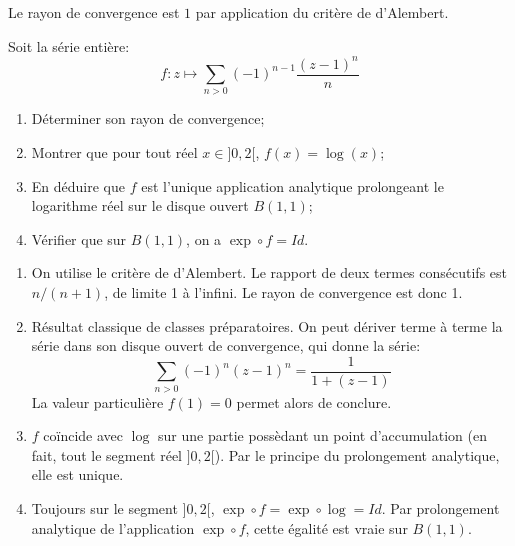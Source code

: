 \documentclass[a4paper, 12pt]{amsart}
\begin{document}
Le rayon de convergence est $1$ par application du critère de d'Alembert.
\begin{fex}
 Soit la série entière:
\[
f \colon z \mapsto \sum_{n >0}(-1)^{n-1}\frac{(z-1)^n}{n}
\]
\begin{enumerate}
  \item Déterminer son rayon de convergence;
  \item Montrer que pour tout réel $x \in ]0,2[$, $f(x)=\log(x)$;
  \item En déduire que $f$ est l'unique application analytique prolongeant le
  logarithme réel sur le disque ouvert $B(1,1)$;
  \item Vérifier que sur $B(1,1)$, on a $\exp \circ f = Id$.
\end{enumerate}
\end{fex}
\begin{enumerate}
 \item On utilise le critère de d'Alembert. Le rapport de deux termes
consécutifs est $n/(n+1)$, de limite 1 à l'infini. Le rayon de convergence est
donc 1.
\item Résultat classique de classes préparatoires. On peut dériver terme à
terme la série dans son disque ouvert de convergence, qui donne la série:
\[
\sum_{n >0}(-1)^{n} (z-1)^n = \frac{1}{1+(z-1)}
\]
La valeur particulière $f(1)=0$ permet alors de conclure.
\item $f$ coïncide avec $\log$ sur une partie possèdant un point d'accumulation
(en fait, tout le segment réel $]0,2[$). Par le principe du prolongement
analytique, elle est unique.
\item Toujours sur le segment $]0,2[$, $\exp \circ f = \exp \circ \log = Id$.
Par prolongement analytique de l'application $\exp \circ f$, cette égalité est
vraie sur $B(1,1)$.
\end{enumerate}
\end{document}
